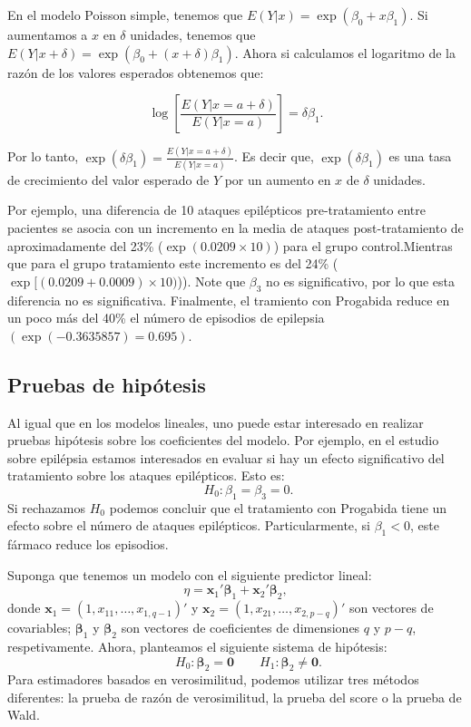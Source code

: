 \documentclass[
]{article}
\begin{document}
En el modelo Poisson simple, tenemos que \(E(Y|x)=\exp(\beta_0+x\beta_1)\). Si aumentamos a \(x\) en \(\delta\) unidades, tenemos que \(E(Y|x+\delta)=\exp(\beta_0+(x+\delta)\beta_1)\). Ahora si calculamos el logaritmo de la razón de los valores esperados obtenemos que:

\[
\log\left[\frac{E(Y|x=a+\delta)}{E(Y|x=a)}\right]=\delta\beta_1.
\]

Por lo tanto, \(\exp(\delta\beta_1)=\frac{E(Y|x=a+\delta)}{E(Y|x=a)}\). Es decir que, \(\exp(\delta\beta_1)\) es una tasa de crecimiento del valor esperado de \(Y\) por un aumento en \(x\) de \(\delta\) unidades.

Por ejemplo, una diferencia de 10 ataques epilépticos pre-tratamiento entre pacientes se asocia con un incremento en la media de ataques post-tratamiento de aproximadamente del 23\% (\(\exp(0.0209\times10)\)) para el grupo control.Mientras que para el grupo tratamiento este incremento es del 24\% (\(\exp[(0.0209+0.0009)\times10)\))). Note que \(\beta_3\) no es significativo, por lo que esta diferencia no es significativa. Finalmente, el tramiento con Progabida reduce en un poco más del 40\% el número de episodios de epilepsia \((\exp(-0.3635857) = 0.695)\).

\subsection{Pruebas de hipótesis}\label{pruebas-de-hipuxf3tesis}

Al igual que en los modelos lineales, uno puede estar interesado en realizar pruebas hipótesis sobre los coeficientes del modelo. Por ejemplo, en el estudio sobre epilépsia estamos interesados en evaluar si hay un efecto significativo del tratamiento sobre los ataques epilépticos. Esto es:
\[
\qquad H_0:\beta_1=\beta_3=0.
\]
Si rechazamos \(H_0\) podemos concluir que el tratamiento con Progabida tiene un efecto sobre el número de ataques epilépticos. Particularmente, si \(\beta_1 < 0\), este fármaco reduce los episodios.

Suponga que tenemos un modelo con el siguiente predictor lineal:
\[
\eta = \boldsymbol x_{1}'\boldsymbol \beta_1+\boldsymbol x_{2}'\boldsymbol \beta_2,
\]
donde \(\boldsymbol x_{1 }= (1,x_{11},\ldots,x_{1,q-1})'\) y \(\boldsymbol x_{2}= (1,x_{21},\ldots,x_{2,p-q})'\) son vectores de covariables; \(\boldsymbol \beta_1\) y \(\boldsymbol \beta_2\) son vectores de coeficientes de dimensiones \(q\) y \(p-q\), respetivamente. Ahora, planteamos el siguiente sistema de hipótesis:
\[
\qquad H_0:\boldsymbol \beta_2=\boldsymbol 0\qquad H_1:\boldsymbol \beta_2 \ne \boldsymbol 0.
\]
Para estimadores basados en verosimilitud, podemos utilizar tres métodos diferentes: la prueba de razón de verosimilitud, la prueba del score o la prueba de Wald.
\end{document}
